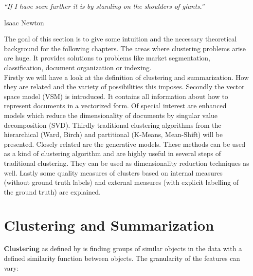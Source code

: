 \epigraph{\emph{
  ``If I have seen further it is by standing on the shoulders of giants.''
}}{ Isaac Newton }

The goal of this section is to give some intuition and the necessary theoretical background for the following chapters. The areas where clustering problems arise are huge. It provides solutions to problems like market segmentation, classification, document organization or indexing.\\
Firstly we will have a look at the definition of clustering and summarization. How they are related and the variety of possibilities this imposes.
Secondly the vector space model (VSM) is introduced. It contains all information about how to represent documents in a vectorized form. Of special interest are enhanced models which reduce the dimensionality of documents by singular value decomposition (SVD).
Thirdly traditional clustering algorithms from the hierarchical (Ward, Birch) and partitional (K-Means, Mean-Shift) will be presented.
Closely related are the generative models. These methods can be used as a kind of clustering algorithm and are highly useful in several steps of traditional clustering. They can be used as dimensionality reduction techniques as well.
Lastly some quality measures of clusters based on internal measures (without ground truth labels) and external measures (with explicit labelling of the ground truth) are explained.


\section{Clustering and Summarization}
  
  \textbf{Clustering} as defined by \cite{ClusterAlgoSurveyIBM} is finding groups of similar objects in the data with a defined similarity function between objects. The granularity of the features can vary:

